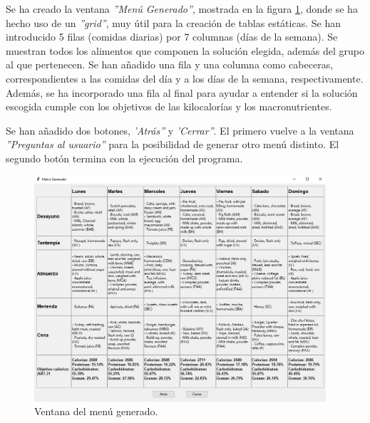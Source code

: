 Se ha creado la ventana \textit{''Menú Generado''}, mostrada en la figura \ref{fig:ventana-menu}, donde se ha hecho uso de un \textit{''grid''}, muy útil para la creación de tablas estáticas. Se han introducido 5 filas (comidas diarias) por 7 columnas (días de la semana). Se muestran todos los alimentos que componen la solución elegida, además del grupo al que pertenecen. Se han añadido una fila y una columna como cabeceras, correspondientes a las comidas del día y a los días de la semana, respectivamente. Además, se ha incorporado una fila al final para ayudar a entender si la solución escogida cumple con los objetivos de las kilocalorías y los macronutrientes.

Se han añadido dos botones, \textit{'Atrás''} y \textit{'Cerrar''}. El primero vuelve a la ventana \textit{''Preguntas al usuario''} para la posibilidad de generar otro menú distinto. El segundo botón termina con la ejecución del programa.

\begin{figure}[H]
    \centering
    \includegraphics[width=0.965\textwidth]{figures/ventana-menu.png}
    \caption{Ventana del menú generado.}
    \label{fig:ventana-menu}
\end{figure}